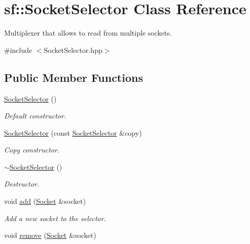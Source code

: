 \hypertarget{classsf_1_1_socket_selector}{}\section{sf\+:\+:Socket\+Selector Class Reference}
\label{classsf_1_1_socket_selector}


Multiplexer that allows to read from multiple sockets.  




{\ttfamily \#include $<$Socket\+Selector.\+hpp$>$}

\subsection*{Public Member Functions}
\begin{DoxyCompactItemize}
\item 
\mbox{\hyperlink{classsf_1_1_socket_selector_a741959c5158aeb1e4457cad47d90f76b}{Socket\+Selector}} ()
\begin{DoxyCompactList}\small\item\em Default constructor. \end{DoxyCompactList}\item 
\mbox{\hyperlink{classsf_1_1_socket_selector_a50b1b955eb7ecb2e7c2764f3f4722fbf}{Socket\+Selector}} (const \mbox{\hyperlink{classsf_1_1_socket_selector}{Socket\+Selector}} \&copy)
\begin{DoxyCompactList}\small\item\em Copy constructor. \end{DoxyCompactList}\item 
\mbox{\hyperlink{classsf_1_1_socket_selector_a9069cd61208260b8ed9cf233afa1f73d}{$\sim$\+Socket\+Selector}} ()
\begin{DoxyCompactList}\small\item\em Destructor. \end{DoxyCompactList}\item 
void \mbox{\hyperlink{classsf_1_1_socket_selector_ade952013232802ff7b9b33668f8d2096}{add}} (\mbox{\hyperlink{classsf_1_1_socket}{Socket}} \&socket)
\begin{DoxyCompactList}\small\item\em Add a new socket to the selector. \end{DoxyCompactList}\item 
void \mbox{\hyperlink{classsf_1_1_socket_selector_a98b6ab693a65b82caa375639232357c1}{remove}} (\mbox{\hyperlink{classsf_1_1_socket}{Socket}} \&socket)

\end{DoxyCompactItemize}
